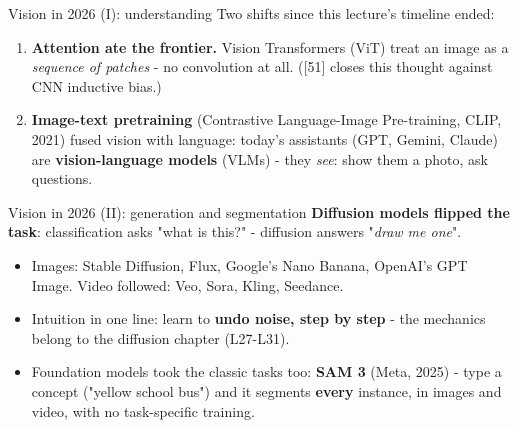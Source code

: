 \documentclass[aspectratio=169]{beamer}
\begin{document}
\begin{frame}{Vision in 2026 (I): understanding}
  Two shifts since this lecture's timeline ended:
  \vskip 6pt
  \begin{enumerate}
    \item \textbf{Attention ate the frontier.} Vision Transformers (ViT) treat an
      image as a \emph{sequence of patches} - no convolution at all. ([51] closes
      this thought against CNN inductive bias.)
    \item \textbf{Image-text pretraining} (Contrastive Language-Image Pre-training,
      CLIP, 2021) fused vision with language: today's assistants (GPT, Gemini, Claude)
      are \textbf{vision-language models} (VLMs) - they \emph{see}: show them a photo,
      ask questions.
  \end{enumerate}
  \vskip 8pt
  \vskip 4pt
  \begin{center}
    \href{https://claude.ai}{}
  \end{center}
\end{frame}

\begin{frame}{Vision in 2026 (II): generation and segmentation}
  \textbf{Diffusion models flipped the task}: classification asks "what is this?" - diffusion
  answers "\emph{draw me one}".
  \vskip 6pt
  \begin{itemize}
    \item Images: Stable Diffusion, Flux, Google's Nano Banana, OpenAI's GPT Image. Video
      followed: Veo, Sora, Kling, Seedance.
    \item Intuition in one line: learn to \textbf{undo noise, step by step} - the mechanics
      belong to the diffusion chapter (L27-L31).
    \item Foundation models took the classic tasks too: \textbf{SAM 3} (Meta, 2025) - type a
      concept ("yellow school bus") and it segments \textbf{every} instance, in images and
      video, with no task-specific training.
  \end{itemize}
  \vskip 6pt
  \vskip 4pt
  \begin{center}
    \href{https://aidemos.meta.com/segment-anything}{}
  \end{center}
\end{frame}
\end{document}
